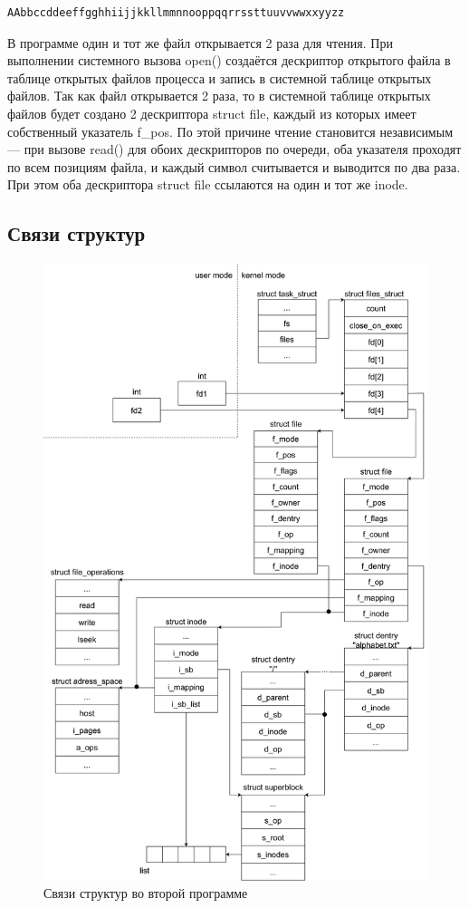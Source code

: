 \documentclass[a4paper,14pt]{extarticle}
\begin{document}
\begin{lstlisting}[caption={\text{Вывод программы}}]
AAbbccddeeffgghhiijjkkllmmnnooppqqrrssttuuvvwwxxyyzz
\end{lstlisting}

В программе один и тот же файл открывается 2 раза для чтения. При выполнении системного вызова open() создаётся дескриптор открытого файла в таблице открытых файлов процесса и запись в системной таблице открытых файлов. Так как файл открывается 2 раза, то в системной таблице открытых файлов будет создано 2 дескриптора struct file, каждый из которых имеет собственный указатель f\_pos. По этой причине чтение становится независимым --- при вызове read() для обоих дескрипторов по очереди, оба указателя проходят по всем позициям файла, и каждый символ считывается и выводится по два раза. При этом оба дескриптора struct file ссылаются на один и тот же inode.

\newpage
\subsection{Связи структур}

\begin{figure}[H]
	\centering
	\includegraphics[height=0.91\textheight]{img/structures-2.drawio.png}
	\caption{Связи структур во второй программе}
\end{figure}
\end{document}
